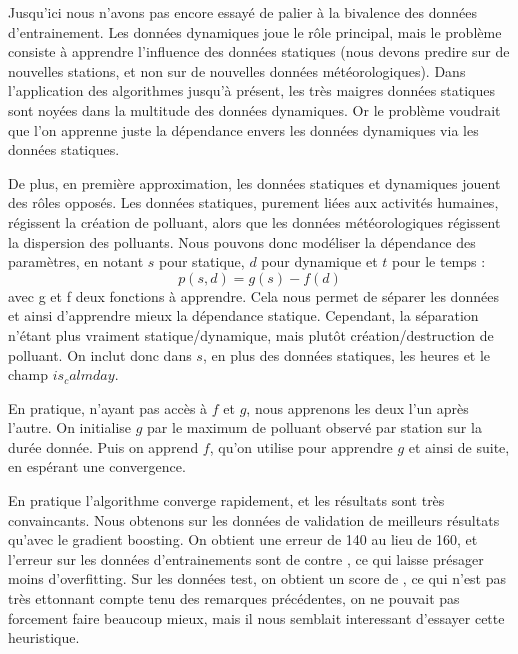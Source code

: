 \documentclass{beamer}
\begin{document}
\begin{frame}

Jusqu'ici nous n'avons pas encore essayé de palier à la bivalence des données d'entrainement. Les données dynamiques joue le rôle principal, mais le problème consiste à apprendre l'influence des données statiques (nous devons predire sur de nouvelles stations, et non sur de nouvelles données météorologiques). Dans l'application des algorithmes jusqu'à présent, les très maigres données statiques sont noyées dans la multitude des données dynamiques. Or le problème voudrait que l'on apprenne juste la dépendance envers les données dynamiques via les données statiques.

De plus, en première approximation, les données statiques et dynamiques jouent des rôles opposés. Les données statiques, purement liées aux activités humaines, régissent la création de polluant, alors que les données météorologiques régissent la dispersion des polluants. Nous pouvons donc modéliser la dépendance des paramètres, en notant $s$ pour statique, $d$ pour dynamique et $t$ pour le temps : $$ p(s,d) = g(s) - f(d)$$ avec g et f deux fonctions à apprendre. Cela nous permet de séparer les données et ainsi d'apprendre mieux la dépendance statique. Cependant, la séparation n'étant plus vraiment statique/dynamique, mais plutôt création/destruction de polluant. On inclut donc dans $s$, en plus des données statiques, les heures et le champ $is_calmday$.

En pratique, n'ayant pas accès à $f$ et $g$, nous apprenons les deux l'un après l'autre. On initialise $g$ par le maximum de polluant observé par station sur la durée donnée. Puis on apprend $f$, qu'on utilise pour apprendre $g$ et ainsi de suite, en espérant une convergence. 


En pratique l'algorithme converge rapidement, et les résultats sont très convaincants. Nous obtenons sur les données de validation de meilleurs résultats qu'avec le gradient boosting. On obtient une erreur de 140 au lieu de 160, et l'erreur sur les données d'entrainements sont de  contre , ce qui laisse présager moins d'overfitting. Sur les données test, on obtient un score de , ce qui n'est pas très ettonnant compte tenu des remarques précédentes, on ne pouvait pas forcement faire beaucoup mieux, mais il nous semblait interessant d'essayer cette heuristique.
\end{frame}

\begin{frame}
  
\end{frame}
\end{document}
